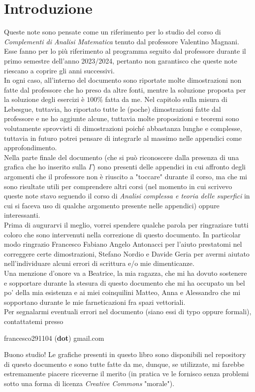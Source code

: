 \documentclass[oneside, italian, fontsize=10pt]{book}
\begin{document}
	\chapter*{Introduzione}
	Queste note sono pensate come un riferimento per lo studio del corso di \emph{Complementi di Analisi Matematica} tenuto dal professore
	Valentino Magnani. Esse fanno per lo più riferimento al programma seguito dal professore durante il primo semestre dell'anno 2023/2024,
	pertanto non garantisco che queste note riescano a coprire gli anni successivi. \\
	In ogni caso, all'interno del documento sono riportate molte dimostrazioni non fatte dal professore che ho preso da altre fonti, mentre
	la soluzione proposta per la soluzione degli esercizi è $100$\% fatta da me. Nel capitolo sulla misura di Lebesgue, tuttavia, ho riportato tutte le (poche) dimostrazioni fatte dal professore e ne ho aggiunte alcune, tuttavia molte 
	proposizioni e teoremi sono volutamente sprovvisti di dimostrazioni poiché abbastanza lunghe e complesse, tuttavia in futuro potrei pensare di integrarle al massimo nelle appendici come approfondimento. \\
	Nella parte finale del documento (che si può riconoscere dalla presenza di una grafica che ho inserito sulla $\Gamma$) sono presenti delle appendici in cui affronto degli argomenti che il professore non è riuscito a "toccare" durante il corso,
	ma che mi sono risultate utili per comprendere altri corsi (nel momento in cui scrivevo queste note stavo seguendo il corso di \emph{Analisi complessa e teoria delle superfici} in cui si faceva uso di qualche argomento presente nelle appendici) oppure interessanti. \\
	Prima di augurarvi il meglio, vorrei spendere qualche parola per ringraziare tutti coloro che sono intervenuti nella correzione di questo documento. In particolar modo ringrazio Francesco Fabiano Angelo Antonacci per l'aiuto prestatomi nel correggere certe dimostrazioni, Stefano Nordio e Davide Geria per avermi aiutato nell'individuare alcuni errori di scrittura e/o mie dimenticanze. \\
	Una menzione d'onore va a Beatrice, la mia ragazza, che mi ha dovuto sostenere e sopportare durante la stesura di questo documento che mi ha occupato un bel po' della mia esistenza e ai miei coinquilini Matteo, Anna e Alessandro che mi sopportano durante le mie farneticazioni fra spazi vettoriali. \\
	Per segnalarmi eventuali errori nel documento (siano essi di typo oppure formali), contattatemi presso
	\begin{center}
		francesco291104 (\textbf{dot}) gmail.com
	\end{center}
	Buono studio!
	\vfill
	Le grafiche presenti in questo libro sono disponibili nel repository di questo documento e sono tutte fatte da me, dunque, se utilizzate, mi farebbe estremamente piacere riceverne il merito (in pratica ve le fornisco senza problemi sotto una forma di licenza \emph{Creative Commons} "morale").
\end{document}
